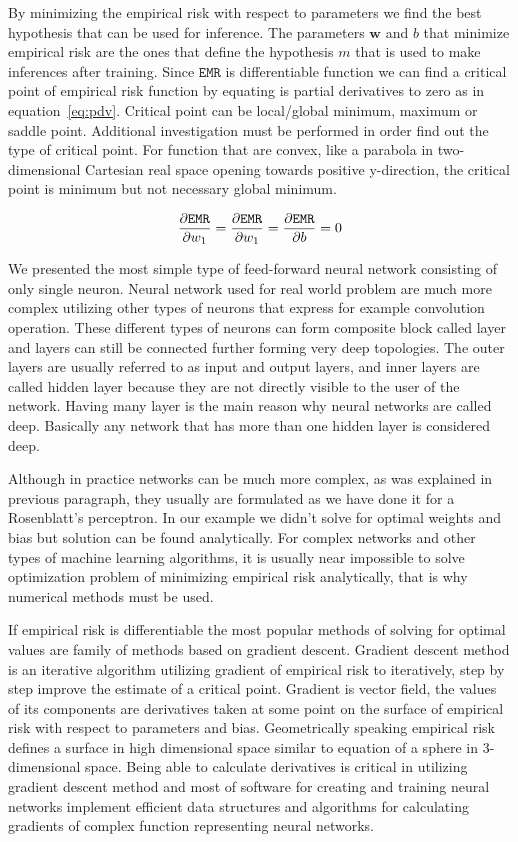 \documentclass[english, 12pt, a4paper, elec, utf8, online]{aaltothesis}
\begin{document}
By minimizing the empirical risk with respect to parameters we find the best hypothesis that can be used for inference.
The parameters $\mathbf{w}$ and $b$ that minimize empirical risk are the ones that define the hypothesis $m$ that is used to make inferences after training.  Since $\mathtt{EMR}$ is differentiable function we can find a critical point of empirical risk function by equating is partial derivatives to zero as in equation~\ref{eq:pdv}. Critical point can be local/global minimum, maximum or saddle point. Additional investigation must be performed in order find out the type of critical point. For function that are convex, like a parabola in two-dimensional Cartesian real space opening towards positive y-direction, the critical point is minimum but not necessary global minimum.

\begin{align}\label{eq:pdv}
\pdv{\texttt{EMR}}{w_1} = \pdv{\texttt{EMR}}{w_1} = \pdv{\texttt{EMR}}{b} = 0
\end{align}

We presented the most simple type of feed-forward neural network consisting of only single neuron. Neural network used for real world problem are much more complex utilizing other types of neurons that express for example convolution operation. These different types of neurons can form composite block called layer and layers can still be connected further forming very deep topologies. The outer layers are usually referred to as input and output layers, and inner layers are called hidden layer because they are not directly visible to the user of the network. Having many layer is the main reason why neural networks are called deep. Basically any network that has more than one hidden layer is considered deep.  
 
Although in practice networks can be much more complex, as was explained in previous paragraph, they usually are formulated as we have done it for a Rosenblatt’s perceptron. In our example we didn't solve for optimal weights and bias but solution can be found analytically. For complex networks and other types of machine learning algorithms, it is usually near impossible to solve optimization problem of minimizing empirical risk analytically, that is why numerical methods must be used.

If empirical risk is differentiable the most popular methods of solving for optimal values are family of methods based on gradient descent.  Gradient descent method is an iterative algorithm utilizing gradient of empirical risk to iteratively, step by step improve the estimate of a critical point. Gradient is vector field, the values of its components are derivatives taken at some point on the surface of empirical risk with respect to parameters and bias.  Geometrically speaking empirical risk defines a surface in high dimensional space similar to equation of a sphere in 3-dimensional space. Being able to calculate derivatives is critical in utilizing gradient descent method and most of software for creating and training neural networks implement efficient data structures and algorithms for calculating  gradients of complex function representing neural networks.
\end{document}
